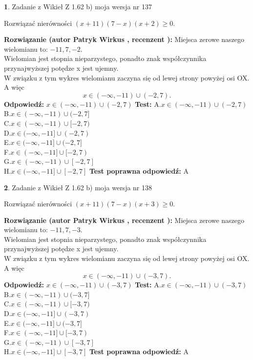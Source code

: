 \documentclass[12pt, a4paper]{article}
\theoremstyle{definition} %
\newtheorem{zad}{}
\newcommand{\zadStart}[1]{\begin{zad}#1\newline}
\newcommand{\zadStop}{\end{zad}}
\newcommand{\rozwStart}[2]{\noindent \textbf{Rozwiązanie (autor #1 , recenzent #2): }\newline}
\newcommand{\rozwStop}{\newline}
\newcommand{\odpStart}{\noindent \textbf{Odpowiedź:}\newline}
\newcommand{\odpStop}{\newline}
\newcommand{\testStart}{\noindent \textbf{Test:}\newline}
\newcommand{\testStop}{\newline}
\newcommand{\kluczStart}{\noindent \textbf{Test poprawna odpowiedź:}\newline}
\newcommand{\kluczStop}{\newline}
\begin{document}
\zadStart{Zadanie z Wikieł Z 1.62 b) moja wersja nr 137}

Rozwiązać nierówności $(x+11)(7-x)(x+2)\ge0$.
\zadStop
\rozwStart{Patryk Wirkus}{}
Miejsca zerowe naszego wielomianu to: $-11, 7, -2$.\\
Wielomian jest stopnia nieparzystego, ponadto znak współczynnika przy\linebreak najwyższej potędze x jest ujemny.\\ W związku z tym wykres wielomianu zaczyna się od lewej strony powyżej osi OX. A więc $$x \in (-\infty,-11) \cup (-2,7).$$
\rozwStop
\odpStart
$x \in (-\infty,-11) \cup (-2,7)$
\odpStop
\testStart
A.$x \in (-\infty,-11) \cup (-2,7)$\\
B.$x \in (-\infty,-11) \cup (-2,7]$\\
C.$x \in (-\infty,-11) \cup [-2,7)$\\
D.$x \in (-\infty,-11] \cup (-2,7)$\\
E.$x \in (-\infty,-11] \cup (-2,7]$\\
F.$x \in (-\infty,-11] \cup [-2,7)$\\
G.$x \in (-\infty,-11) \cup [-2,7]$\\
H.$x \in (-\infty,-11] \cup [-2,7]$
\testStop
\kluczStart
A
\kluczStop



\zadStart{Zadanie z Wikieł Z 1.62 b) moja wersja nr 138}

Rozwiązać nierówności $(x+11)(7-x)(x+3)\ge0$.
\zadStop
\rozwStart{Patryk Wirkus}{}
Miejsca zerowe naszego wielomianu to: $-11, 7, -3$.\\
Wielomian jest stopnia nieparzystego, ponadto znak współczynnika przy\linebreak najwyższej potędze x jest ujemny.\\ W związku z tym wykres wielomianu zaczyna się od lewej strony powyżej osi OX. A więc $$x \in (-\infty,-11) \cup (-3,7).$$
\rozwStop
\odpStart
$x \in (-\infty,-11) \cup (-3,7)$
\odpStop
\testStart
A.$x \in (-\infty,-11) \cup (-3,7)$\\
B.$x \in (-\infty,-11) \cup (-3,7]$\\
C.$x \in (-\infty,-11) \cup [-3,7)$\\
D.$x \in (-\infty,-11] \cup (-3,7)$\\
E.$x \in (-\infty,-11] \cup (-3,7]$\\
F.$x \in (-\infty,-11] \cup [-3,7)$\\
G.$x \in (-\infty,-11) \cup [-3,7]$\\
H.$x \in (-\infty,-11] \cup [-3,7]$
\testStop
\kluczStart
A
\kluczStop
\end{document}
